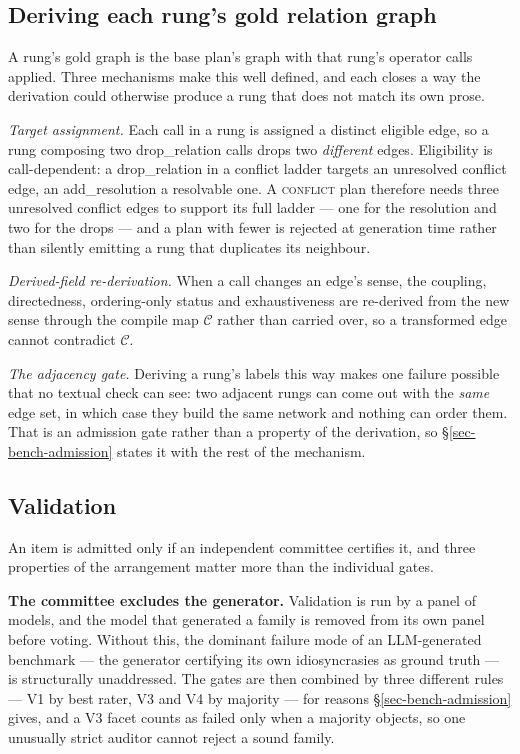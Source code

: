 \subsection{Deriving each rung's gold relation graph}
\label{sec-bench-gold}

A rung's gold graph is the base plan's graph with that rung's operator calls applied. Three mechanisms
make this well defined, and each closes a way the derivation could otherwise produce a rung that does not
match its own prose.

\emph{Target assignment.} Each call in a rung is assigned a distinct eligible edge, so a rung composing
two \textsf{drop\_relation} calls drops two \emph{different} edges. Eligibility is call-dependent: a
\textsf{drop\_relation} in a conflict ladder targets an unresolved conflict edge, an
\textsf{add\_resolution} a resolvable one. A \textsc{conflict} plan therefore needs three unresolved
conflict edges to support its full ladder --- one for the resolution and two for the drops --- and a plan
with fewer is rejected at generation time rather than silently emitting a rung that duplicates its
neighbour.

\emph{Derived-field re-derivation.} When a call changes an edge's sense, the coupling, directedness,
ordering-only status and exhaustiveness are re-derived from the new sense through the compile map
$\mathcal{C}$ rather than carried over, so a transformed edge cannot contradict $\mathcal{C}$.

\emph{The adjacency gate.} Deriving a rung's labels this way makes one failure possible that no textual
check can see: two adjacent rungs can come out with the \emph{same} edge set, in which case they build the
same network and nothing can order them. That is an admission gate rather than a property of the derivation,
so \S\ref{sec-bench-admission} states it with the rest of the mechanism.

\subsection{Validation}
\label{sec-bench-validation}

An item is admitted only if an independent committee certifies it, and three properties of the
arrangement matter more than the individual gates.

\textbf{The committee excludes the generator.} Validation is run by a panel of models, and the model that
generated a family is removed from its own panel before voting. Without this, the dominant failure mode of
an LLM-generated benchmark --- the generator certifying its own idiosyncrasies as ground truth --- is
structurally unaddressed. The gates are then combined by three different rules ---
V1 by best rater, V3 and V4 by majority --- for reasons \S\ref{sec-bench-admission} gives, and a V3 facet
counts as failed only when a majority objects, so one unusually strict auditor cannot reject a sound
family.

